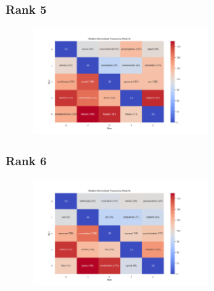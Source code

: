 \documentclass[11pt]{article}
\begin{document}
\subsubsection{Rank 5}
\begin{center}


\resizebox{\columnwidth}{!}
{
\TTRNFTable
}
\begin{figure}[h!]
  \includegraphics[width=0.6\textwidth]{figs/top_ten_rnf/rnf_w_rank_5.png}
\end{figure}
\end{center}

\pagebreak

\subsubsection{Rank 6}
\begin{center}


\resizebox{\columnwidth}{!}
{
\TTRNFTable
}
\begin{figure}[h!]
  \includegraphics[width=0.6\textwidth]{figs/top_ten_rnf/rnf_w_rank_6.png}
\end{figure}
\end{center}
\end{document}
